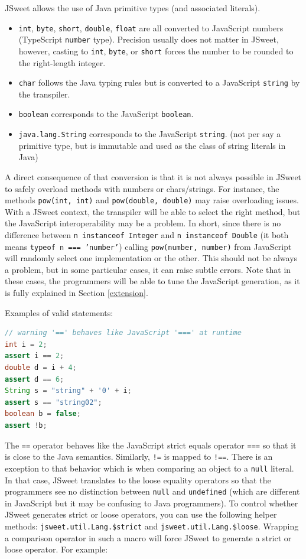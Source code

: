 \documentclass[a4paper]{report}
\begin{document}
JSweet allows the use of Java primitive types (and associated literals).

\begin{itemize}
\item \texttt{int}, \texttt{byte}, \texttt{short}, \texttt{double}, \texttt{float} are all converted to JavaScript numbers (TypeScript \texttt{number} type). Precision usually does not matter in JSweet, however, casting to \texttt{int}, \texttt{byte}, or \texttt{short} forces the number to be rounded to the right-length integer.
\item \texttt{char} follows the Java typing rules but is converted to a JavaScript \texttt{string} by the transpiler.
\item \texttt{boolean} corresponds to the JavaScript \texttt{boolean}.
\item \texttt{java.lang.String} corresponds to the JavaScript \texttt{string}. (not per say a primitive type, but is immutable and used as the class of string literals in Java)
\end{itemize}

A direct consequence of that conversion is that it is not always possible in JSweet to safely overload methods with numbers or chars/strings. For instance, the methods \texttt{pow(int, int)} and \texttt{pow(double, double)} may raise overloading issues. With a JSweet context, the transpiler will be able to select the right method, but the JavaScript interoperability may be a problem. In short, since there is no difference between \texttt{n instanceof Integer} and \texttt{n instanceof Double} (it both means \texttt{typeof n === 'number'}) calling \texttt{pow(number, number)} from JavaScript will randomly select one implementation or the other. This should not be always a problem, but in some particular cases, it can raise subtle errors. Note that in these cases, the programmers will be able to tune the JavaScript generation, as it is fully explained in Section \ref{extension}.

\noindent
Examples of valid statements:

\begin{lstlisting}[language=Java]
// warning '==' behaves like JavaScript '===' at runtime
int i = 2;
assert i == 2;
double d = i + 4;
assert d == 6;
String s = "string" + '0' + i;
assert s == "string02";
boolean b = false;
assert !b;
\end{lstlisting}

The \texttt{==} operator behaves like the JavaScript strict equals operator \texttt{===} so that it is close to the Java semantics. Similarly, \texttt{!=} is mapped to \texttt{!==}. There is an exception to that behavior which is when comparing an object to a \texttt{null} literal. In that case, JSweet translates to the loose equality operators so that the programmers see no distinction between \texttt{null} and \texttt{undefined} (which are different in JavaScript but it may be confusing to Java programmers). To control whether JSweet generates strict or loose operators, you can use the following helper methods: \texttt{jsweet.\-util.\-Lang.\-\$strict} and \texttt{jsweet.\-util.\-Lang.\-\$loose}. Wrapping a comparison operator in such a macro will force JSweet to generate a strict or loose operator. For example:
\end{document}
